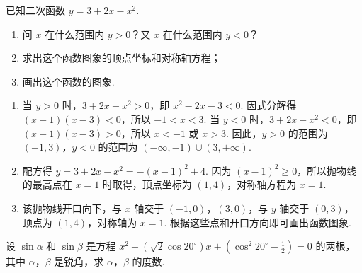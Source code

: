 \begin{problem}
已知二次函数 \(y=3+2x-x^2\).

\begin{enumerate}
\item 问 \(x\) 在什么范围内 \(y>0\)？又 \(x\) 在什么范围内 \(y<0\)？
\item 求出这个函数图象的顶点坐标和对称轴方程；
\item 画出这个函数的图象.
\end{enumerate}
\end{problem}

\begin{solution}
\begin{enumerate}
\item 当 \(y>0\) 时，\(3+2x-x^2>0\)，即 \(x^2-2x-3<0\). 因式分解得 \(\left( x+1 \right)\left( x-3 \right)<0\)，所以 \(-1<x<3\). 当 \(y<0\) 时，\(3+2x-x^2<0\)，即 \(\left( x+1 \right)\left( x-3 \right)>0\)，所以 \(x<-1\) 或 \(x>3\). 因此，\(y>0\) 的范围为 \(\left( -1,3 \right)\)，\(y<0\) 的范围为 \(\left( -\infty,-1 \right)\cup\left( 3,+\infty \right)\).

\item 配方得 \(y=3+2x-x^2=-\left( x-1 \right)^2+4\). 因为 \(\left( x-1 \right)^2\geq 0\)，所以抛物线的最高点在 \(x=1\) 时取得，顶点坐标为 \((1,4)\)，对称轴方程为 \(x=1\).

\item 该抛物线开口向下，与 \(x\) 轴交于 \((-1,0)\)，\((3,0)\)，与 \(y\) 轴交于 \((0,3)\)，顶点为 \((1,4)\)，对称轴为 \(x=1\). 根据这些点和开口方向即可画出函数图象.
\end{enumerate}

\end{solution}

\begin{problem}
设 \(\sin\alpha\) 和 \(\sin\beta\) 是方程 \(x^2-\left( \sqrt{2}\cos20^\circ \right)x+\left( \cos^2 20^\circ-\frac{1}{2} \right)=0\) 的两根，其中 \(\alpha\)，\(\beta\) 是锐角，求 \(\alpha\)，\(\beta\) 的度数.
\end{problem}

